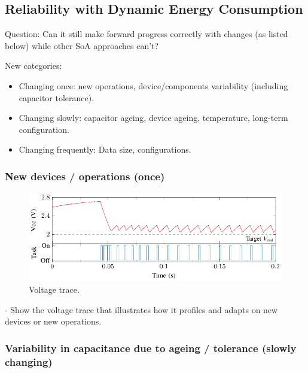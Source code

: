 
\subsection{Reliability with Dynamic Energy Consumption}

Question: Can it still make forward progress correctly with changes (as listed below) while other SoA approaches can't? 

New categories:

\begin{itemize}
    \item Changing once: new operations, device/components variability (including capacitor tolerance).
    \item Changing slowly: capacitor ageing, device ageing, temperature, long-term configuration.
    \item Changing frequently: Data size, configurations. 
\end{itemize}

\subsubsection{New devices / operations (once)}

\begin{figure}
    \centering
    \includegraphics[width=\columnwidth]{ch5_optic/figures/v_trace/v_trace.pdf}
    \caption{Voltage trace. }
    \label{fig:v_trace}
\end{figure}

- Show the voltage trace that illustrates how it profiles and adapts on new devices or new operations. 

\subsubsection{Variability in capacitance due to ageing / tolerance (slowly changing)}




